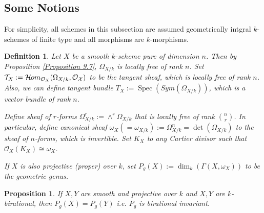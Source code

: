 \documentclass{ctexart}
\newtheorem{definition}{Definition}[section]
\newtheorem{proposition}{Proposition}[section]
\newcommand{\sheafhom}{\mathcal{H}\kern -.5pt om}
\newcommand{\spec}{\operatorname{Spec}}
\begin{document}
\subsection{Some Notions}
For simplicity, all schemes in this subsection are assumed geometrically intgral $k$-schemes of finite type and all morphisms are $k$-morphisms.
\begin{definition}
    Let $X$ be a smooth $k$-scheme pure of dimension $n$.
    Then by Proposition \ref{Proposition 9.7}, $\Omega_{X/k}$ is locally free of rank $n$.
    Set $\mathcal{T}_{X} := \sheafhom_{\mathcal{O}_{X}}(\Omega_{X/k}, \mathcal{O_{X}})$ to be the tangent sheaf, which is locally free of rank $n$.
    Also, we can define tangent bundle $T_{X} := \spec(Sym(\Omega_{X/k}))$, which is a vector bundle of rank $n$.
    \par
    Define sheaf of $r$-forms $\Omega_{X/k}^{r} := \wedge^{r} \Omega_{X/k}$ that is locally free of rank $\binom{n}{r}$.
    In particular, define canonical sheaf $\omega_{X} (= \omega_{X/k}) := \Omega_{X/k}^{n} = \det(\Omega_{X/k})$ to the sheaf of $n$-forms, which is invertible.
    Set $K_{X}$ to any Cartier divisor such that $\mathcal{O}_{X}(K_{X}) \cong \omega_{X}$.
    \par
    If $X$ is also projective (proper) over $k$, set $P_{g}(X) := \dim_{k}(\Gamma(X, \omega_{X}))$ to be the geometric genus.
\end{definition}
\begin{proposition}
    If $X,Y$ are smooth and projective over $k$ and $X,Y$ are $k$-birational, then $P_{g}(X) = P_{g}(Y)$ i.e. $P_{g}$ is birational invariant.
    \label{Proposition 9.8}
\end{proposition}
\end{document}
